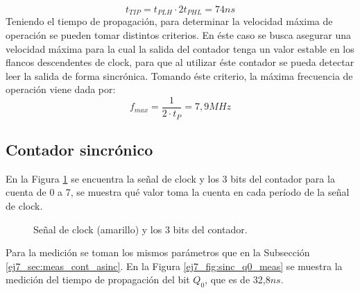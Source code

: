 \begin{equation}
     t_{TIP} = t_{PLH}\cdot 2 t_{PHL} = 74ns
 \end{equation}
 Teniendo el tiempo de propagaci\'on, para determinar la velocidad m\'axima de operaci\'on se pueden tomar distintos criterios. En \'este caso se busca asegurar una velocidad m\'axima para la cual la salida del contador tenga un valor estable en los flancos descendentes de clock, para que al utilizar \'este contador se pueda detectar leer la salida de forma sincr\'onica. Tomando \'este criterio, la m\'axima frecuencia de operaci\'on viene dada por:
 \begin{equation}
     f_{max} = \frac{1}{2\cdot t_{P}} = 7,9MHz
     \label{ej7_eq:vel_max}
 \end{equation}
\subsection{Contador sincr\'onico}
\noindent
En la Figura \ref{ej7_fig:sinc_allbits} se encuentra la señal de clock y los 3 bits del contador para la cuenta de 0 a 7, se muestra qu\'e valor toma la cuenta en cada per\'iodo de la señal de clock.
%
\begin{figure}[H]
	\centering
	\caption{Señal de clock (amarillo) y los 3 bits del contador.}
	\label{ej7_fig:sinc_allbits}
\end{figure}
%
\noindent
Para la medici\'on se toman los mismos par\'ametros que en la Subsecci\'on \ref{ej7_sec:meas_cont_asinc}. En la Figura \ref{ej7_fig:sinc_q0_meas} se muestra la medici\'on del tiempo de propagaci\'on del bit $Q_0$, que es de 32,8$ns$. 
%
